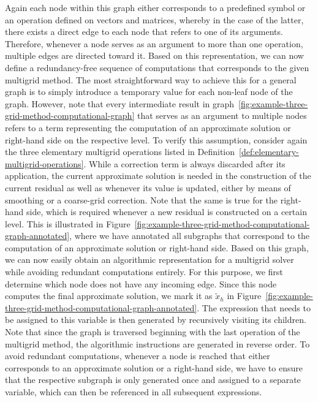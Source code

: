 Again each node within this graph either corresponds to a predefined symbol or an operation defined on vectors and matrices, whereby in the case of the latter, there exists a direct edge to each node that refers to one of its arguments.  
Therefore, whenever a node serves as an argument to more than one operation, multiple edges are directed toward it.
Based on this representation, we can now define a redundancy-free sequence of computations that corresponds to the given multigrid method.
The most straightforward way to achieve this for a general graph is to simply introduce a temporary value for each non-leaf node of the graph.
However, note that every intermediate result in graph~\ref{fig:example-three-grid-method-computational-graph} that serves as an argument to multiple nodes refers to a term representing the computation of an approximate solution or right-hand side on the respective level.
To verify this assumption, consider again the three elementary multigrid operations listed in Definition~\ref{def:elementary-multigrid-operations}.
While a correction term is always discarded after its application, the current approximate solution is needed in the construction of the current residual as well as whenever its value is updated, either by means of smoothing or a coarse-grid correction.
Note that the same is true for the right-hand side, which is required whenever a new residual is constructed on a certain level.
This is illustrated in Figure~\ref{fig:example-three-grid-method-computational-graph-annotated}, where we have annotated all subgraphs that correspond to the computation of an approximate solution or right-hand side.
Based on this graph, we can now easily obtain an algorithmic representation for a multigrid solver while avoiding redundant computations entirely.
For this purpose, we first determine which node does not have any incoming edge.
Since this node computes the final approximate solution, we mark it as $\tilde{x}_h$ in Figure~\ref{fig:example-three-grid-method-computational-graph-annotated}.
The expression that needs to be assigned to this variable is then generated by recursively visiting its children.
Note that since the graph is traversed beginning with the last operation of the multigrid method, the algorithmic instructions are generated in reverse order. 
To avoid redundant computations, whenever a node is reached that either corresponds to an approximate solution or a right-hand side, we have to ensure that the respective subgraph is only generated once and assigned to a separate variable, which can then be referenced in all subsequent expressions.
